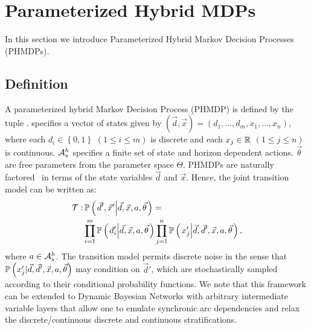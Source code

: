 \section{Parameterized Hybrid MDPs}
\label{sec:hybrid_mdps}

In this section we introduce Parameterized Hybrid Markov Decision Processes (PHMDPs).

\subsection{Definition}
\label{sec:phmdp_def}

A parameterized hybrid Markov Decision Process (PHMDP) is defined by the tuple {\footnotesize \PMDPTuple}. {\footnotesize \State} specifies a vector of states given by {\footnotesize $(\vec{d}, \vec{x}) =  \left( d_1, \ldots, d_m, x_1, \ldots, x_n \right) $}, where each {\footnotesize $ d_i \in \left\lbrace 0, 1 \right\rbrace $} {\footnotesize $\left( 1 \leq i \leq m \right)$} is discrete and each {\footnotesize$ x_j \in \mathbb{R} $} {\footnotesize $\left( 1 \leq j \leq   n \right)$} is continuous. {\footnotesize $\mathcal{A}^{h}_{s}$} specifies a finite set of state and horizon dependent actions.  {\footnotesize $\vec{\theta} $} are free parameters from the parameter space {\footnotesize $ \Theta $}. PHMDPs are naturally factored~\cite{Boutilier_JAIR_1999} in terms of the state variables {\footnotesize$\vec{d}$} and {\footnotesize
$\vec{x}$}. Hence, the joint transition model can be written as:
{\footnotesize
\abovedisplayskip=0pt
\belowdisplayskip=0pt
\begin{align}
    \label{eq:hmdp_tfunc}
    \mathcal{T} :& \, \mathbb{P}\left({ \left. \vec{d}', \vec{x}' \middle| \vec{d}, \vec{x}, a, \vec{\theta} \right.}\right) = \nonumber \\
    & \prod_{i=1}^{m} \mathbb{P}\left({ \left. d_i' \middle| \vec{d}, \vec{x}, a, \vec{\theta} \right. }\right) \prod_{j=1}^{n} \mathbb{P}\left({ \left. x_j' \middle| \vec{d}, \vec{d}', \vec{x}, a, \vec{\theta} \right. }\right),
\end{align}   
}
where {\footnotesize $ a \in \mathcal{A}^{h}_{s} $}. The transition model permits discrete noise in the sense that {\footnotesize $ \mathbb{P}\left({ x_j' | \vec{d}, \vec{d}', \vec{x}, a, \vec{\theta} }\right) $} may condition on $ \vec{d}' $, which are stochastically sampled according to their conditional probability functions. We note that this framework can be extended to Dynamic Bayesian Networks with arbitrary intermediate variable layers that allow one to emulate synchronic arc dependencies and relax the discrete/continuous 
discrete and continuous stratifications.

